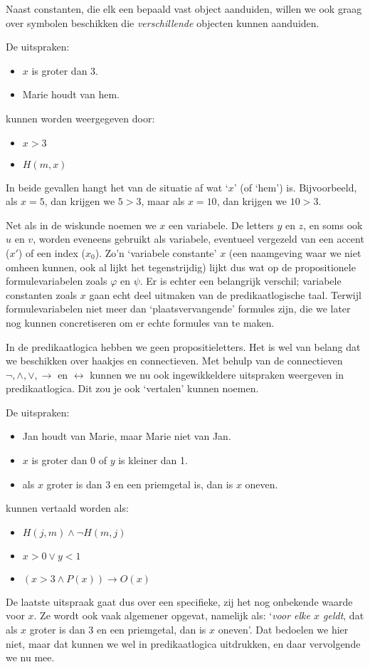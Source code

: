 Naast constanten, die elk een bepaald vast object aanduiden, willen we ook graag over symbolen beschikken die \textit{verschillende} objecten kunnen aanduiden.
\begin{example}
De uitspraken:
\begin{itemize}
    \item $x$ is groter dan 3.
    \item Marie houdt van hem.
\end{itemize}
kunnen worden weergegeven door:
\begin{itemize}
    \item $x>3$
    \item $H(m,x)$
\end{itemize}
In beide gevallen hangt het van de situatie af wat `$x$' (of `hem') is. Bijvoorbeeld, als $x=5$, dan krijgen we $5>3$, maar als $x=10$, dan krijgen we $10>3$.
\end{example}

Net als in de wiskunde noemen we $x$ een variabele. De letters $y$ en $z$, en soms ook $u$ en $v$, worden eveneens gebruikt als variabele, eventueel vergezeld van een accent ($x'$) of een index ($x_0$). Zo'n `variabele constante' $x$ (een naamgeving waar we niet omheen kunnen, ook al lijkt het tegenstrijdig) lijkt dus wat op de propositionele formulevariabelen zoals $\varphi$ en $\psi$. Er is echter een belangrijk verschil; variabele constanten zoals $x$ gaan echt deel uitmaken van de predikaatlogische taal. Terwijl formulevariabelen niet meer dan `plaatsvervangende' formules zijn, die we later nog kunnen concretiseren om er echte formules van te maken.

In de predikaatlogica hebben we geen propositieletters. Het is wel van belang dat we beschikken over haakjes en connectieven. Met behulp van de connectieven $\neg,\wedge,\vee,\rightarrow$ en $\leftrightarrow$ kunnen we nu ook ingewikkeldere uitspraken weergeven in predikaatlogica. Dit zou je ook `vertalen' kunnen noemen.

\begin{example}
De uitspraken:
\begin{itemize}
    \item Jan houdt van Marie, maar Marie niet van Jan.
    \item $x$ is groter dan 0 of $y$ is kleiner dan 1.
    \item als $x$ groter is dan 3 en een priemgetal is, dan is $x$ oneven.
\end{itemize}
kunnen vertaald worden als:
\begin{itemize}
    \item $H(j,m)\wedge\neg H(m,j)$
    \item $x>0\vee y<1$
    \item $(x>3\wedge P(x))\rightarrow O(x)$
\end{itemize}
De laatste uitspraak gaat dus over een specifieke, zij het nog onbekende waarde voor $x$. Ze wordt ook vaak algemener opgevat, namelijk als: `\textit{voor elke $x$ geldt}, dat als $x$ groter is dan 3 en een priemgetal, dan is $x$ oneven'. Dat bedoelen we hier niet, maar dat kunnen we wel in predikaatlogica uitdrukken, en daar vervolgende we nu mee.
\end{example}

